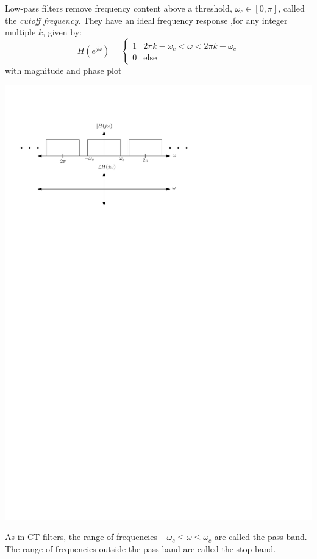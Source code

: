 Low-pass filters remove frequency content above a threshold, $\omega_c \in [0,\pi]$, called the \emph{cutoff frequency}. They have an ideal frequency response ,for any integer multiple $k$, given by:
\[
H\left(e^{j\omega}\right) = \left\{ \begin{array}{lc}
  1 & 2\pi k -\omega_c < \omega < 2\pi k + \omega_c\\
  0 & \text{else}
\end{array}
\right. 
\]
with magnitude and phase plot
\begin{center}
  \includegraphics[scale=1]{graphics/lowpass-ideal-dt.pdf}
\end{center}
As in CT filters, the range of frequencies $-\omega_c \leq \omega \leq \omega_c$ are called the pass-band. The range of frequencies outside the pass-band are called the stop-band.

